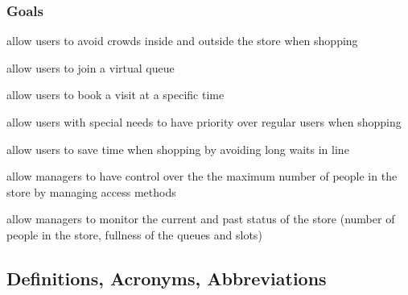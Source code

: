 \subsubsection{Goals}
\begin{enumerate}[label={[G\arabic*]}]
    \item allow users to avoid crowds inside and outside the store when shopping
    \begin{enumerate}[label={[G1.\arabic*]}]
        \item allow users to join a virtual queue
        \item allow users to book a visit at a specific time
    \end{enumerate}
    \item allow users with special needs to have priority over regular users when shopping
    \item allow users to save time when shopping by avoiding long waits in line
    \item allow managers to have control over the the maximum number of people in the store by managing access methods
    \item allow managers to monitor the current and past status of the store (number of people in the store, fullness of the queues and slots)
\end{enumerate}

\subsection{Definitions, Acronyms, Abbreviations}

